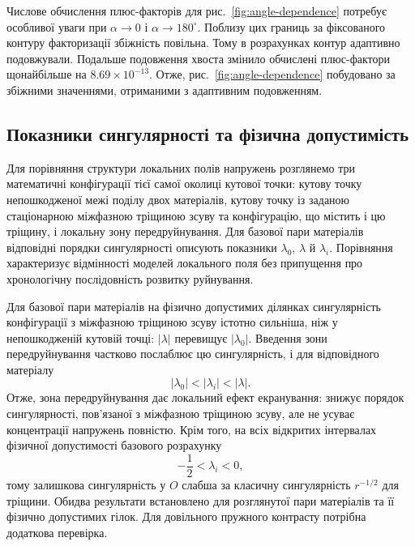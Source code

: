 Числове обчислення плюс-факторів для рис.~\ref{fig:angle-dependence} потребує особливої уваги при $\alpha\to0$ і $\alpha\to180^\circ$. Поблизу цих границь за фіксованого контуру факторизації збіжність повільна. Тому в розрахунках контур адаптивно подовжували. Подальше подовження хвоста змінило обчислені плюс-фактори щонайбільше на $8.69\times10^{-13}$. Отже, рис.~\ref{fig:angle-dependence} побудовано за збіжними значеннями, отриманими з адаптивним подовженням.

\subsection{Показники сингулярності та фізична допустимість}
\label{subsec:figure4}

Для порівняння структури локальних полів напружень розглянемо три математичні конфігурації тієї самої околиці кутової точки: кутову точку непошкодженої межі поділу двох матеріалів, кутову точку із заданою стаціонарною міжфазною тріщиною зсуву та конфігурацію, що містить і цю тріщину, і локальну зону передруйнування. Для базової пари матеріалів відповідні порядки сингулярності описують показники $\lambda_0$, $\lambda$ й $\lambda_i$. Порівняння характеризує відмінності моделей локального поля без припущення про хронологічну послідовність розвитку руйнування.


Для базової пари матеріалів на фізично допустимих ділянках сингулярність конфігурації з міжфазною тріщиною зсуву істотно сильніша, ніж у непошкодженій кутовій точці: $|\lambda|$ перевищує $|\lambda_0|$. Введення зони передруйнування частково послаблює цю сингулярність, і для відповідного матеріалу
\begin{equation*}
  |\lambda_0|<|\lambda_i|<|\lambda|.
\end{equation*}
Отже, зона передруйнування дає локальний ефект екранування: знижує порядок сингулярності, пов’язаної з міжфазною тріщиною зсуву, але не усуває концентрації напружень повністю. Крім того, на всіх відкритих інтервалах фізичної допустимості базового розрахунку
\begin{equation*}
  -\frac12<\lambda_i<0,
\end{equation*}
тому залишкова сингулярність у $O$ слабша за класичну сингулярність $r^{-1/2}$ для тріщини. Обидва результати встановлено для розглянутої пари матеріалів та її фізично допустимих гілок. Для довільного пружного контрасту потрібна додаткова перевірка.

